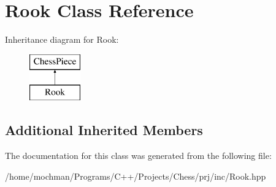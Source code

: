 \hypertarget{class_rook}{\section{Rook Class Reference}
\label{class_rook}
}
Inheritance diagram for Rook\-:\begin{figure}[H]
\begin{center}
\leavevmode
\includegraphics[height=2.000000cm]{class_rook}
\end{center}
\end{figure}
\subsection*{Additional Inherited Members}


The documentation for this class was generated from the following file\-:\begin{DoxyCompactItemize}
\item 
/home/mochman/\-Programs/\-C++/\-Projects/\-Chess/prj/inc/Rook.\-hpp\end{DoxyCompactItemize}
